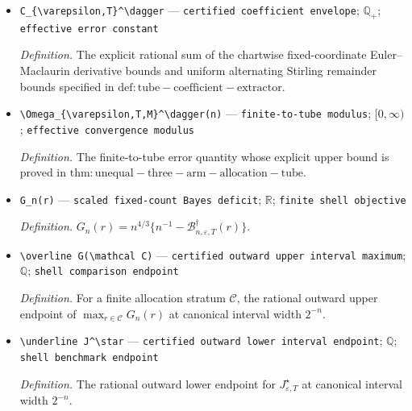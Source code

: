 \documentclass{article}
\begin{document}
\begin{itemize}
  \par\smallskip\noindent\emph{Definition.} The outward-rounded rational sum of the fixed-coordinate Euler--Maclaurin derivative bounds and uniform Stirling remainder bounds for chart \(\kappa_{\mathrm{ch}}\).
  \item \texttt{C\_\allowbreak{}\{\textbackslash{}\allowbreak{}varepsilon,\allowbreak{}T\}\allowbreak{}\textasciicircum{}\textbackslash{}\allowbreak{}dagger} --- \texttt{certified coefficient envelope}; \(\mathbb Q_+\); \texttt{effective error constant}
  \par\smallskip\noindent\emph{Definition.} The explicit rational sum of the chartwise fixed-coordinate Euler--Maclaurin derivative bounds and uniform alternating Stirling remainder bounds specified in \(\mathrm{def:tube-coefficient-extractor}\).
  \item \texttt{\textbackslash{}\allowbreak{}Omega\_\allowbreak{}\{\textbackslash{}\allowbreak{}varepsilon,\allowbreak{}T,\allowbreak{}M\}\allowbreak{}\textasciicircum{}\textbackslash{}\allowbreak{}dagger(n)} --- \texttt{finite-\allowbreak{}to-\allowbreak{}tube modulus}; \([0,\infty)\); \texttt{effective convergence modulus}
  \par\smallskip\noindent\emph{Definition.} The finite-to-tube error quantity whose explicit upper bound is proved in \(\mathrm{thm:unequal-three-arm-allocation-tube}\).
  \item \texttt{G\_\allowbreak{}n(r)} --- \texttt{scaled fixed-\allowbreak{}count Bayes deficit}; \(\mathbb R\); \texttt{finite shell objective}
  \par\smallskip\noindent\emph{Definition.} \(G_n(r)=n^{4/3}\{n^{-1}-\mathcal B_{n,\varepsilon,T}^\dagger(r)\}\).
  \item \texttt{\textbackslash{}\allowbreak{}overline G(\textbackslash{}\allowbreak{}mathcal C)} --- \texttt{certified outward upper interval maximum}; \(\mathbb Q\); \texttt{shell comparison endpoint}
  \par\smallskip\noindent\emph{Definition.} For a finite allocation stratum \(\mathcal C\), the rational outward upper endpoint of \(\max_{r\in\mathcal C}G_n(r)\) at canonical interval width \(2^{-n}\).
  \item \texttt{\textbackslash{}\allowbreak{}underline J\textasciicircum{}\textbackslash{}\allowbreak{}star} --- \texttt{certified outward lower interval endpoint}; \(\mathbb Q\); \texttt{shell benchmark endpoint}
  \par\smallskip\noindent\emph{Definition.} The rational outward lower endpoint for \(J_{\varepsilon,T}^\star\) at canonical interval width \(2^{-n}\).

\end{itemize}
\end{document}
